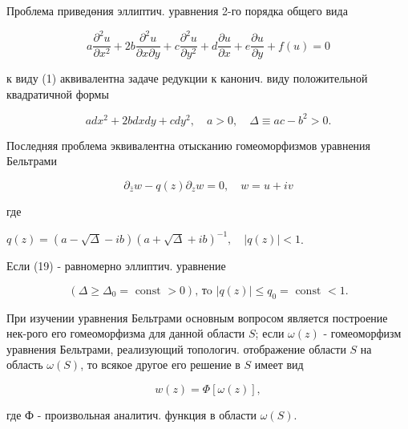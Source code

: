 \documentclass[10pt]{article}
\begin{document}
Проблема приведөния эллиптич. уравнения 2-го порядка общего вида



\[

a \frac{\partial^{2} u}{\partial x^{2}}+2 b \frac{\partial^{2} u}{\partial x \partial y}+c \frac{\partial^{2} u}{\partial y^{2}}+d \frac{\partial u}{\partial x}+e \frac{\partial u}{\partial y}+f(u)=0

\]



к виду (1) аквивалентна задаче редукции к канонич. виду положительной квадратичной формы



\[

a d x^{2}+2 b d x d y+c d y^{2}, \quad a>0, \quad \Delta \equiv a c-b^{2}>0 .

\]



Последняя проблема эквивалентна отысканию гомеоморфизмов уравнения Бельтрами



\[

\partial_{\bar{z}} w-q(z) \partial_{z} w=0, \quad w=u+i v

\]



где



$q(z)=(a-\sqrt{\Delta}-i b)(a+\sqrt{\Delta}+i b)^{-1}, \quad|q(z)|<1$.



Если (19) - равномерно эллиптич. уравнение



\[

\left(\Delta \geqslant \Delta_{0}=\text { const }>0\right) \text {, тo }|q(z)| \leqslant q_{0}=\text { const }<1 .

\]



При изучении уравнения Бельтрами основным вопросом является построение нек-рого его гомеоморфизма для данной области $S$; если $\omega(z)$ - гомеоморфизм уравнения Бельтрами, реализующий топологич. отображение области $S$ на область $\omega(S)$, то всякое другое его решение в $S$ имеет вид



\[

w(z)=\Phi[\omega(z)],

\]



где Ф - произвольная аналитич. функция в области $\omega(S)$.
\end{document}
